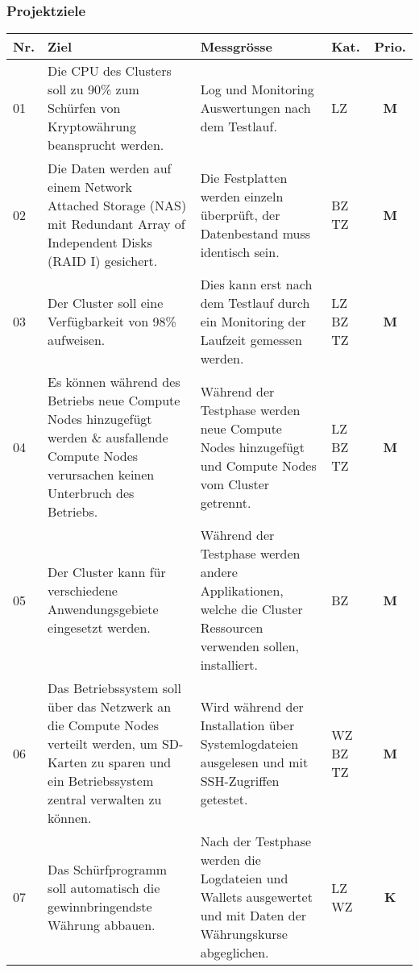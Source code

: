 \newpage
\subsubsection{Projektziele} 
\label{sec:Projektziele}

\begin{table}[H]
\begin{tabular}[t]{p{0.7cm}|p{6.1cm}p{6.1cm} >{\centering}p{0.6cm}c}
\hline
\rowcolor{heading}\textbf{Nr.} & \textbf{Ziel} & \textbf{Messgrösse} & \textbf{Kat.} & \textbf{Prio.} \\\hline
01 & Die CPU des Clusters soll zu 90\% zum Schürfen von Kryptowährung  beansprucht werden. & Log und Monitoring Auswertungen nach dem Testlauf. & LZ & \textbf{M} \\\hline
02 & Die Daten werden auf einem Network Attached Storage (NAS) mit Redundant Array of Independent Disks (RAID I) gesichert. & Die Festplatten werden einzeln überprüft, der Datenbestand muss identisch sein. & BZ \newline TZ & \textbf{M} \\\hline
03 & Der Cluster soll eine Verfügbarkeit von 98\% aufweisen. & Dies kann erst nach dem Testlauf durch ein Monitoring der Laufzeit gemessen werden. & LZ \newline BZ \newline TZ & \textbf{M} \\\hline
04 & Es können während des Betriebs neue Compute Nodes hinzugefügt werden \& ausfallende Compute Nodes verursachen keinen Unterbruch des Betriebs. & Während der Testphase werden neue Compute Nodes hinzugefügt und Compute Nodes vom Cluster getrennt.  & LZ \newline BZ \newline TZ & \textbf{M} \\\hline 
05 & Der Cluster kann für verschiedene Anwendungsgebiete eingesetzt werden. & Während der Testphase werden andere Applikationen, welche die Cluster Ressourcen verwenden sollen, installiert. & BZ & \textbf{M} \\\hline
06 & Das Betriebssystem soll über das Netzwerk an die Compute Nodes verteilt werden, um SD-Karten zu sparen und ein Betriebssystem zentral verwalten zu können. & Wird während der Installation über Systemlogdateien ausgelesen und mit SSH-Zugriffen getestet. & WZ \newline BZ \newline TZ & \textbf{M} \\\hline
07 & Das Schürfprogramm soll automatisch die gewinnbringendste Währung abbauen. & Nach der Testphase werden die Logdateien und Wallets ausgewertet und mit Daten der Währungskurse abgeglichen. & LZ \newline WZ & \textbf{K} \\\hline

\end{tabular}
\end{table}
